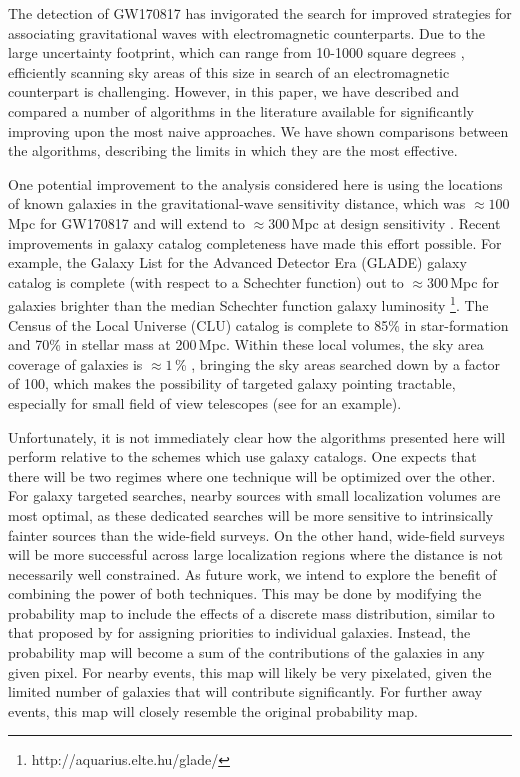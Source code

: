 \documentclass[twocolumn]{aastex62}
\begin{document}
The detection of GW170817 \citep{AbEA2017b} has invigorated the search for improved strategies for associating gravitational waves with electromagnetic
counterparts.
Due to the large uncertainty footprint, which can range from 10-1000 square degrees \citep{AbEA2016h}, efficiently scanning sky areas  of this size in search of an electromagnetic counterpart is challenging.
However, in this paper, we have described and compared a number of algorithms in the literature available for significantly improving upon the most naive approaches.
We have shown comparisons between the algorithms, describing the limits in which they are the most effective.

One potential improvement to the analysis considered here is using the locations of known galaxies in the gravitational-wave sensitivity distance, which was $\approx 100$\,Mpc for GW170817 \citep{AbEA2017b} and will extend to $\approx 300$\,Mpc at design sensitivity \citep{AbEA2016h}. 
Recent improvements in galaxy catalog completeness have made this effort possible. For example, the Galaxy List for the Advanced Detector Era (GLADE) galaxy catalog is complete (with respect to a Schechter function) out to $\approx 300$\,Mpc for galaxies brighter than the median Schechter function galaxy luminosity \footnote{http://aquarius.elte.hu/glade/}. The Census of the Local Universe (CLU) catalog \citep{CoKa2017} is complete to 85\% in star-formation and 70\% in stellar mass at 200\,Mpc.
Within these local volumes, the sky area coverage of galaxies is $\approx 1$\,\% \cite{CoKa2017}, bringing the sky areas searched down by a factor of 100, which makes the possibility of targeted galaxy pointing tractable, especially for small field of view telescopes (see \cite{ArMc2017} for an example). 

Unfortunately, it is not immediately clear how the algorithms presented here will perform relative to the schemes which use galaxy catalogs.
One expects that there will be two regimes where one technique will be optimized over the other.
For galaxy targeted searches, nearby sources with small localization volumes are most optimal, as these dedicated searches will be more sensitive to intrinsically fainter sources than the wide-field surveys.
On the other hand, wide-field surveys will be more successful across large localization regions where the distance is not necessarily well constrained.
As future work, we intend to explore the benefit of combining the power of both techniques. This may be done by modifying the probability map to include the effects of a discrete mass distribution, similar to that proposed by \cite{ArMc2017} for assigning priorities to individual galaxies. Instead, the probability map will become a sum of the contributions of the galaxies in any given pixel. For nearby events, this map will likely be very pixelated, given the limited number of galaxies that will contribute significantly. For further away events, this map will closely resemble the original probability map.
\end{document}
